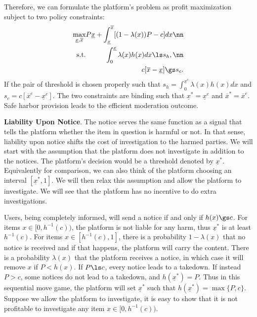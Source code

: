 Therefore, we can formulate the platform's problem as profit maximization subject to two policy constraints:
\begin{eqnarray}
\max_{\underline{x},\overline{x}} &&
\hspace{-1em} P\underline{x}+\int_{\underline{x}}^{\overline{x}} [(1-\lambda(x))P-c]dx \nn\\
\mbox{s.t.} &&\hspace{-1em} \int_0^{\underline{x}}\lambda(x)h(x)dx\ls s_h, \nn\\
&&\hspace{-1em} c[\overline{x}-\underline{x}]\gs s_c.
\end{eqnarray}
If the pair of threshold is chosen properly such that $s_h=\int_0^{\underline{x}^e}\lambda(x)h(x)dx$ and $s_c=c[\overline{x}^e-\underline{x}^e]$. 
The two constraints are binding such that $\underline{x}^*=\underline{x}^e$ and $\overline{x}^*=\overline{x}^e$.
Safe harbor provision leads to the efficient moderation outcome.


\textbf{Liability Upon Notice}.
The notice serves the same function as a signal that tells the platform whether the item in question is harmful or not. In that sense, liability upon notice shifts the cost of investigation to the harmed parties.
We will start with the assumption that the platform does not investigate in addition to the notices. The platform's decision would be a threshold denoted by $\underline{x}^*$. Equivalently for comparison, we can also think of the platform choosing an interval $[\underline{x}^*,1]$. We will then relax this assumption and allow the platform to investigate. We will see that the platform has no incentive to do extra investigations. 

Users, being completely informed, will send a notice if and only if $h(x)\gs c$. 
For items $x\in[0,h^{-1}(c))$, the platform is not liable for any harm, thus $\underline{x}^*$ is at least $h^{-1}(c)$. For items $x\in[h^{-1}(c),1]$, there is a probability $1-\lambda(x)$ that no notice is received and if that happens, the platform will carry the content. There is a probability $\lambda(x)$ that the platform receives a notice, in which case it will remove $x$ if $P<h(x)$. If $P\ls c$, every notice leads to a takedown. If instead $P>c$, some notices do not lead to a takedown, and $h(\underline{x}^*)=P$. Thus in this sequential move game, the platform will set $\underline{x}^*$ such that $h(\underline{x}^*)=\max\{P,c\}$. Suppose we allow the platform to investigate, it is easy to show that it is not profitable to investigate any item $x\in[0,h^{-1}(c))$.

